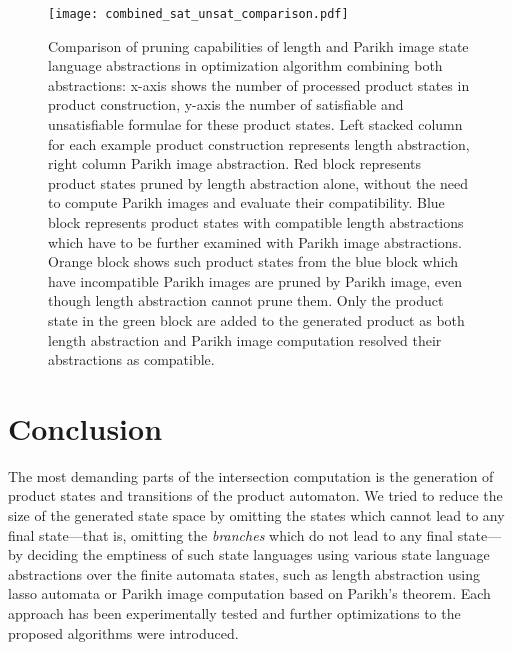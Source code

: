 \begin{figure}[ht]
	\centering
	\texttt{[image: combined\_sat\_unsat\_comparison.pdf]}
	\caption{Comparison of pruning capabilities of length and Parikh image state language abstractions in optimization algorithm combining both abstractions: x-axis shows the number of processed product states in product construction, y-axis the number of satisfiable and unsatisfiable formulae for these product states. Left stacked column for each example product construction represents length abstraction, right column Parikh image abstraction. Red block represents product states pruned by length abstraction alone, without the need to compute Parikh images and evaluate their compatibility. Blue block represents product states with compatible length abstractions which have to be further examined with Parikh image abstractions. Orange block shows such product states from the blue block which have incompatible Parikh images are pruned by Parikh image, even though length abstraction cannot prune them. Only the product state in the green block are added to the generated product as both length abstraction and Parikh image computation resolved their abstractions as compatible.}
	\label{fig:diagram:combined_sat_unsat_comparison}
\end{figure}


\chapter{Conclusion}

The most demanding parts of the intersection computation is the generation of product states and transitions of the product automaton. We tried to reduce the size of the generated state space by omitting the states which cannot lead to any final state---that is, omitting the \textit{branches} which do not lead to any final state---by deciding the emptiness of such state languages using various state language abstractions over the finite automata states, such as length abstraction using lasso automata or Parikh image computation based on Parikh's theorem. Each approach has been experimentally tested and further optimizations to the proposed algorithms were introduced.

